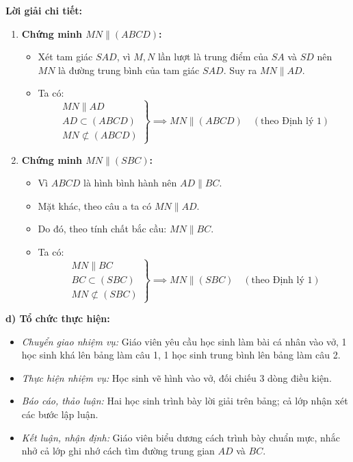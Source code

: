 \documentclass[12pt, a4paper]{article}
\begin{document}
\textbf{Lời giải chi tiết:}
\begin{enumerate}[leftmargin=0.6cm]
    \item \textbf{Chứng minh $MN \parallel (ABCD)$:}
    \begin{itemize}
        \item Xét tam giác $SAD$, vì $M, N$ lần lượt là trung điểm của $SA$ và $SD$ nên $MN$ là đường trung bình của tam giác $SAD$. Suy ra $MN \parallel AD$.
        \item Ta có:
        $$\left.\begin{array}{l} MN \parallel AD \\ AD \subset (ABCD) \\ MN \not\subset (ABCD) \end{array}\right\} \implies MN \parallel (ABCD) \quad (\text{theo Định lý 1})$$
    \end{itemize}

    \item \textbf{Chứng minh $MN \parallel (SBC)$:}
    \begin{itemize}
        \item Vì $ABCD$ là hình bình hành nên $AD \parallel BC$.
        \item Mặt khác, theo câu a ta có $MN \parallel AD$.
        \item Do đó, theo tính chất bắc cầu: $MN \parallel BC$.
        \item Ta có:
        $$\left.\begin{array}{l} MN \parallel BC \\ BC \subset (SBC) \\ MN \not\subset (SBC) \end{array}\right\} \implies MN \parallel (SBC) \quad (\text{theo Định lý 1})$$
    \end{itemize}
\end{enumerate}

\noindent \textbf{d) Tổ chức thực hiện:}
\begin{itemize}[leftmargin=0.8cm]
    \item \textit{Chuyển giao nhiệm vụ:} Giáo viên yêu cầu học sinh làm bài cá nhân vào vở, 1 học sinh khá lên bảng làm câu 1, 1 học sinh trung bình lên bảng làm câu 2.
    \item \textit{Thực hiện nhiệm vụ:} Học sinh vẽ hình vào vở, đối chiếu 3 dòng điều kiện.
    \item \textit{Báo cáo, thảo luận:} Hai học sinh trình bày lời giải trên bảng; cả lớp nhận xét các bước lập luận.
    \item \textit{Kết luận, nhận định:} Giáo viên biểu dương cách trình bày chuẩn mực, nhắc nhở cả lớp ghi nhớ cách tìm đường trung gian $AD$ và $BC$.
\end{itemize}
\end{document}
